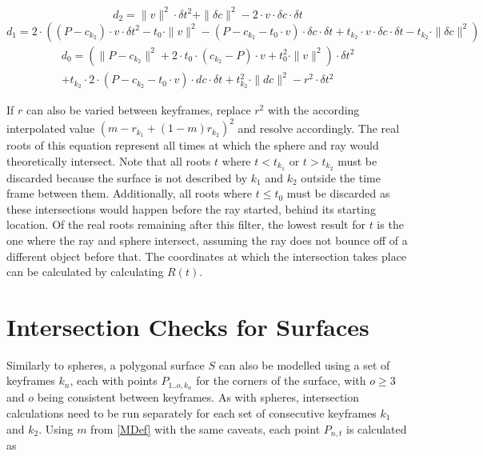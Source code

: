 \begin{equation}
    d_2 = \|v\|^2 \cdot \delta t^2
    + \|\delta c\|^2
    - 2 \cdot v \cdot \delta c \cdot \delta t
\end{equation}
\begin{equation}
    d_1 = 2 \cdot (
    (P - c_{k_2}) \cdot v \cdot \delta t^2
    - t_0 \cdot \|v\|^2
    - (P - c_{k_2} - t_0 \cdot v) \cdot \delta c \cdot \delta t
    + t_{k_2} \cdot v \cdot \delta c \cdot \delta t
    - t_{k_2} \cdot \|\delta c\|^2
    )
\end{equation}
\begin{equation}
    \begin{split}
        d_0 = (
        \|P - c_{k_2}\|^2
        + 2 \cdot t_0 \cdot (c_{k_2} - P) \cdot v
        + t_0^2 \cdot \|v\|^2
        ) \cdot \delta t^2
        \\
        + t_{k_2} \cdot 2 \cdot (P - c_{k_2} - t_0 \cdot v) \cdot dc \cdot \delta t
        + t_{k_2}^2 \cdot \|dc\|^2
        - r^2 \cdot \delta t^2
    \end{split}
\end{equation}

If \(r\) can also be varied between keyframes,
replace \(r^2\) with the according interpolated value \((m - r_{k_1} + (1-m) r_{k_2})^2\) and resolve accordingly.
\newline
The real roots of this equation represent all times at which the sphere and ray would theoretically intersect.
Note that all roots \(t\) where \(t < t_{k_1}\) or \(t > t_{k_2}\) must be discarded
because the surface is not described by \(k_1\) and \(k_2\) outside the time frame between them.
Additionally, all roots where \(t \le t_0\) must be discarded as these intersections would happen before the ray started,
behind its starting location.
\newline
Of the real roots remaining after this filter, the lowest result for \(t\) is the one where the ray and sphere intersect,
assuming the ray does not bounce off of a different object before that.
The coordinates at which the intersection takes place can be calculated by calculating \(R(t)\).


\section{Intersection Checks for Surfaces}

Similarly to spheres, a polygonal surface \(S\) can also be modelled using a set of keyframes \(k_n\),
each with points \(P_{1..o, k_n}\) for the corners of the surface, with \(o \ge 3\) and \(o\) being consistent between keyframes.
As with spheres, intersection calculations need to be run separately for each set of consecutive keyframes \(k_1\) and \(k_2\).
\newline
Using \(m\) from \eqref{MDef} with the same caveats, each point \(P_{n, t}\) is calculated as

